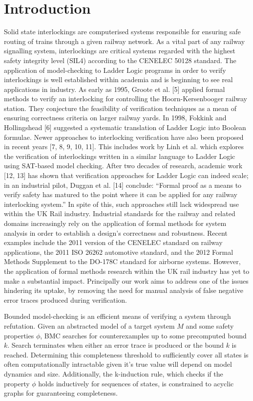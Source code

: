 \documentclass[runningheads]{llncs}
\begin{document}
\section{Introduction}
Solid state interlockings are computerised systems responsible for ensuring safe routing
of trains through a given railway network. As a vital part of any railway signalling
system, interlockings are critical systems regarded with the highest safety integrity level
(SIL4) according to the CENELEC 50128 standard. The application of model-checking
to Ladder Logic programs in order to verify interlockings is well established within
academia and is beginning to see real applications in industry. As early as 1995, Groote
et al. [5] applied formal methods to verify an interlocking for controlling the Hoorn-Kersenbooger railway station. They conjecture the feasibility of verification techniques
as a mean of ensuring correctness criteria on larger railway yards. In 1998, Fokkink
and Hollingshead [6] suggested a systematic translation of Ladder Logic into Boolean
formulae. Newer approaches to interlocking verification have also been proposed in recent
years [7, 8, 9, 10, 11]. This includes work by Linh et al. which explores the verification
of interlockings written in a similar language to Ladder Logic using SAT-based model
checking. After two decades of research, academic work [12, 13] has shown that verification
approaches for Ladder Logic can indeed scale; in an industrial pilot, Duggan et al. [14]
conclude: “Formal proof as a means to verify safety has matured to the point where it
can be applied for any railway interlocking system.” In spite of this, such approaches
still lack widespread use within the UK Rail industry. Industrial standards for the railway and related domains increasingly rely on the application of formal methods for system analysis in order to establish a design’s correctness and robustness. Recent examples include the 2011 version of the CENELEC standard on railway applications, the 2011 ISO 26262 automotive standard, and the 2012 Formal Methods Supplement to the DO-178C standard for airborne systems. However, the application of formal methods research within the UK rail industry has yet to make a substantial impact. Principally our work aims to address one of the issues hindering its uptake, by removing the need for manual analysis of false negative error traces produced during verification.

Bounded model-checking is an efficient means of verifying a system through refutation. Given an abstracted model of a target system $M$ and some safety properties $\phi$, BMC searches for counterexamples up to some precomputed bound $k$. Search terminates when either an error trace is produced or the bound $k$ is reached. Determining this completeness threshold to sufficiently cover all states is often computationally intractable given it's true value will depend on model dynamics and size. Additionally, the k-induction rule, which checks if the property $\phi$ holds inductively for sequences of states, is constrained to acyclic graphs for guaranteeing completeness. 
\end{document}
